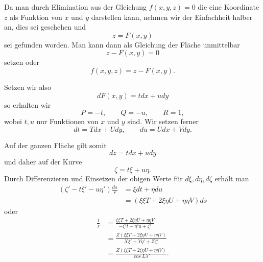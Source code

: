 \par{}%
\noindent\hspace*{1.2em}Da man durch Elimination aus der Gleichung $f(x,y,z)=0$ die eine Koordinate $z$ als Funktion von $x$ und $y$ darstellen kann, nehmen wir der Einfachheit halber an, dies sei geschehen und
\[
z=F(x,y)
\]
sei gefunden worden. Man kann dann als Gleichung der Fläche unmittelbar
\[
z-F(x,y)=0
\]
setzen oder
\[
f(x,y,z)=z-F(x,y).
\]

Setzen wir also
\[
dF(x,y)=tdx+udy
\]
so erhalten wir
\[
P=-t,\qquad Q=-u,\qquad R=1,
\]
wobei $t,u$ nur Funktionen von $x$ und $y$ sind. Wir setzen ferner
\[
dt=Tdx+Udy,\qquad du=Udx+Vdy.
\]

Auf der ganzen Fläche gilt somit
\[
dz=tdx+udy
\]
und daher auf der Kurve
\[
\zeta=t\xi+u\eta.
\]
Durch Differenzieren und Einsetzen der obigen Werte für $d\xi,d\eta,d\zeta$ erhält man
\[
\begin{aligned}
(\zeta'-t\xi'-u\eta')\frac{ds}{r}&=\xi dt+\eta du\\
&=(\xi\xi T+2\xi\eta U+\eta\eta V)ds
\end{aligned}
\]
oder
\[
\begin{aligned}
\frac1r&=\frac{\xi\xi T+2\xi\eta U+\eta\eta V}{-\xi't-\eta'u+\zeta'}\\
&=\frac{Z(\xi\xi T+2\xi\eta U+\eta\eta V)}{X\xi'+Y\eta'+Z\zeta'}\\
&=\frac{Z(\xi\xi T+2\xi\eta U+\eta\eta V)}{\cos L\lambda'}.
\end{aligned}
\]
